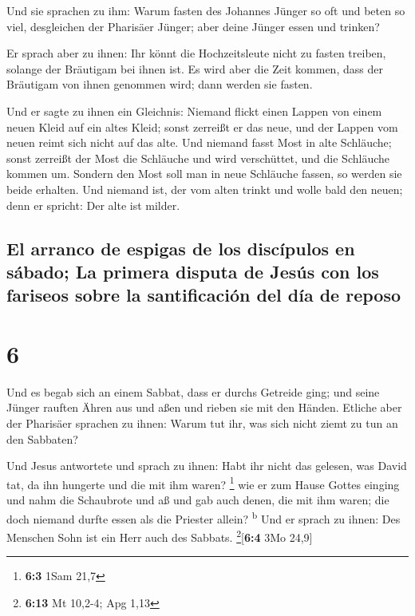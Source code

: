  Und sie sprachen zu ihm: Warum fasten des Johannes
Jünger so oft und beten so viel, desgleichen der Pharisäer Jünger; aber
deine Jünger essen und trinken?

 Er sprach aber zu ihnen: Ihr könnt die Hochzeitsleute
nicht zu fasten treiben, solange der Bräutigam bei ihnen ist.
 Es wird aber die Zeit kommen, dass der Bräutigam von
ihnen genommen wird; dann werden sie fasten.

 Und er sagte zu ihnen ein Gleichnis: Niemand flickt
einen Lappen von einem neuen Kleid auf ein altes Kleid; sonst zerreißt
er das neue, und der Lappen vom neuen reimt sich nicht auf das alte.
 Und niemand fasst Most in alte Schläuche; sonst zerreißt
der Most die Schläuche und wird verschüttet, und die Schläuche kommen
um.  Sondern den Most soll man in neue Schläuche fassen,
so werden sie beide erhalten.  Und niemand ist, der vom
alten trinkt und wolle bald den neuen; denn er spricht: Der alte ist
milder.

\hypertarget{el-arranco-de-espigas-de-los-discuxedpulos-en-suxe1bado-la-primera-disputa-de-jesuxfas-con-los-fariseos-sobre-la-santificaciuxf3n-del-duxeda-de-reposo}{%
\subsection{El arranco de espigas de los discípulos en sábado; La
primera disputa de Jesús con los fariseos sobre la santificación del día
de
reposo}\label{el-arranco-de-espigas-de-los-discuxedpulos-en-suxe1bado-la-primera-disputa-de-jesuxfas-con-los-fariseos-sobre-la-santificaciuxf3n-del-duxeda-de-reposo}}

\hypertarget{section-5}{%
\section{6}\label{section-5}}

 Und es begab sich an einem Sabbat, dass er durchs
Getreide ging; und seine Jünger rauften Ähren aus und aßen und rieben
sie mit den Händen.  Etliche aber der Pharisäer sprachen
zu ihnen: Warum tut ihr, was sich nicht ziemt zu tun an den Sabbaten?

 Und Jesus antwortete und sprach zu ihnen: Habt ihr nicht
das gelesen, was David tat, da ihn hungerte und die mit ihm waren?
\footnote{\textbf{6:3} 1Sam 21,7}  wie er zum Hause Gottes
einging und nahm die Schaubrote und aß und gab auch denen, die mit ihm
waren; die doch niemand durfte essen als die Priester allein?
\textsuperscript{b}  Und er sprach zu ihnen: Des Menschen
Sohn ist ein Herr auch des Sabbats. \footnote{\textbf{6:13} Mt 10,2-4;
  Apg 1,13}{[}\textbf{6:4} 3Mo 24,9{]}

